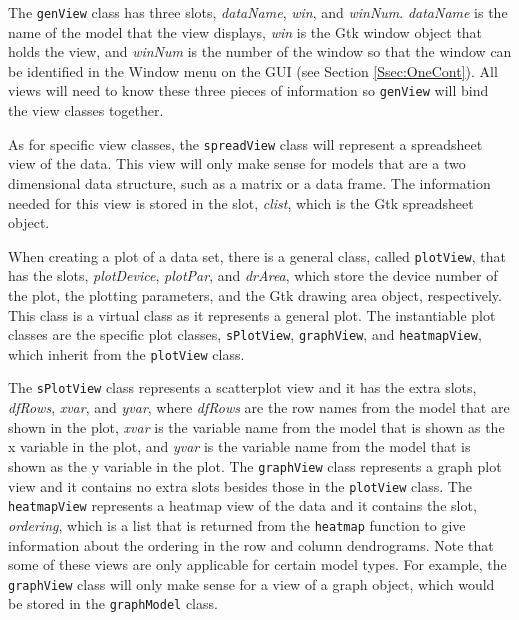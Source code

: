 \documentclass{article}[11pt]
\newcommand{\Rfunction}[1]{{\texttt{#1}}}
\newcommand{\Robject}[1]{{\texttt{#1}}}
\newcommand{\Rslot}[1]{\textsl{#1}}
\begin{document}
The \Robject{genView} class has three slots, \Rslot{dataName}, \Rslot{win},
and \Rslot{winNum}.  \Rslot{dataName} is the name of the model that the view
displays, \Rslot{win} is the Gtk window object that holds the view, and
\Rslot{winNum} is the number of the window so that the window can be
identified in the Window menu on the GUI (see Section \ref{Ssec:OneCont}).
All views will need to know these three pieces of information so
\Robject{genView} will bind the view classes together. 

As for specific view classes, the \Robject{spreadView} class will represent a
spreadsheet view of the data.  This view will only make sense for models that
are a two dimensional data structure, such as a matrix or a data frame.  The
information needed for this view is stored in the slot, \Rslot{clist}, which
is the Gtk spreadsheet object.

When creating a plot of a data set, there is a general class, called
\Robject{plotView}, that has the slots, \Rslot{plotDevice}, \Rslot{plotPar},
and \Rslot{drArea}, which store the device number of the plot, the plotting
parameters, and the Gtk drawing area object, respectively.  This class is a
virtual class as it represents a general plot.  The instantiable plot classes
are the specific plot classes, \Robject{sPlotView}, \Robject{graphView}, and
\Robject{heatmapView}, which inherit from the \Robject{plotView} class.  

The \Robject{sPlotView} class represents a scatterplot view and it has the
extra slots, \Rslot{dfRows}, \Rslot{xvar}, and \Rslot{yvar}, where
\Rslot{dfRows} are the row names from the model that are shown in the plot,
\Rslot{xvar} is the variable name from the model that is shown as the x
variable in the plot, and \Rslot{yvar} is the variable name from the model
that is shown as the y variable in the plot.  The \Robject{graphView} class
represents a graph plot view and it contains no extra slots besides those in
the \Robject{plotView} class.  The \Robject{heatmapView} represents a heatmap
view of the data and it contains the slot, \Rslot{ordering}, which is a list
that is returned from the \Rfunction{heatmap} function to give information
about the ordering in the row and column dendrograms.  Note that some of these
views are only applicable for certain model types. For example, the
\Robject{graphView} class will only make sense for a view of a graph object,
which would be stored in the \Robject{graphModel} class. 
\end{document}
